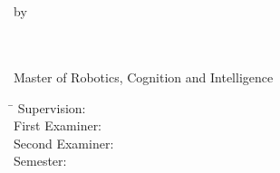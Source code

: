\begin{titlepage}
 \rmfamily %
		
			\begin{center}
				\centering				

				\begin{figure}[H]
					\begin{center}
						\workTUMLogo
					\end{center}
				\end{figure}				
				
			\end{center}

		
   \centering
			\Large
   {\huge \textbf{\workTitel}}\\
   
   {\LARGE \workTyp}\\
   
   by\\

   \textbf{\workNameStudent\\}
      
   {\LARGE \textbf{\workHochschule\\}
    Master of Robotics, Cognition and Intelligence\\

   }


\begin{tabbing}
\hspace{5cm}\=\kill
 Supervision: \> \WorkSupervisor\\
 First Examiner: \> \WorkPruefer\\
 Second Examiner: \> \secondWorkPruefer\\
 Semester: \> \workSemester\\
\end{tabbing} 

     

     
\end{titlepage}